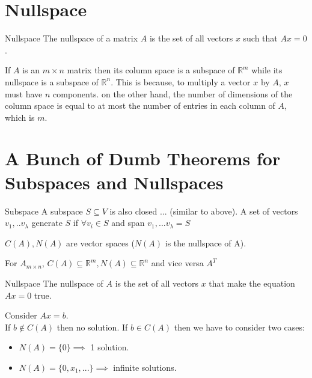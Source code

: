 \documentclass[11pt]{article}
\begin{document}
\section{Nullspace}

\begin{definitionbox}{Nullspace}
    The nullspace of a matrix $A$ is the set of all vectors $x$ such that $Ax=0$.
\end{definitionbox}

If $A$ is an $m \times n$ matrix then its column space is a subspace of $\mathbb{R}^m$ while its
nullspace is a subspace of $\mathbb{R}^n$. This is because, to multiply a vector $x$ by $A$, $x$ must
have $n$ components. on the other hand, the number of dimensions of the column space is equal to at
most the number of entries in each column of $A$, which is $m$.

\newpage

\section{A Bunch of Dumb Theorems for Subspaces and Nullspaces}
\begin{definitionbox}{Subspace}
    A subspace $S \subseteq V$ is also closed ... (similar to above). A set of vectors
    ${v_1,..v_\lambda}$ generate $S$ if $\forall v_i \in S$ and span ${v_1,...v_\lambda} = S$
\end{definitionbox}

\begin{theorembox}{}
    $C(A), N(A)$ are vector spaces ($N(A)$ is the nullspace of A).
\end{theorembox}

\begin{theorembox}{}
    For $A_{m \times n}$, $C(A) \subseteq \mathbb{R}^m, N(A) \subseteq \mathbb{R}^n$ and vice versa
    $A^T$
\end{theorembox}

\begin{definitionbox}{Nullspace}
    The nullspace of $A$ is the set of all vectors $x$ that make the equation $Ax=0$ true.
\end{definitionbox}

\begin{theorembox}{}
    Consider $Ax=b$. \\
    If $b \notin C(A)$ then no solution.
    If $b \in C(A)$ then we have to consider two cases:
    \begin{itemize}
        \item $N(A)=\{0\} \implies$ 1 solution.
        \item $N(A)=\{0,x_1,...\} \implies$ infinite solutions.
    \end{itemize}
\end{theorembox}
\end{document}
